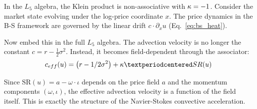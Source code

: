 In the $L_5$ algebra, the Klein product is non-associative with $\kappa = -1$. Consider the market state evolving under the log-price coordinate $x$. The price dynamics in the B-S framework are governed by the linear drift $c \cdot \partial_x u$ (Eq.~\ref{eq:bs_heat}).

Now embed this in the full $L_5$ algebra. The advection velocity is no longer the constant $c = r - \frac{1}{2}\sigma^2$. Instead, it becomes field-dependent through the associator:
\begin{equation}\label{eq:arithmetic scheme_advection}
    c_{\mathrm{eff}}(u) = \left(r - \frac{1}{2}\sigma^2\right) + \kap \cdot \mathrm{SR}(u)
\end{equation}

Since $\mathrm{SR}(u) = a - \omega\cdot\iota$ depends on the price field $a$ and the momentum components $(\omega, \iota)$, the effective advection velocity is a function of the field itself. This is exactly the structure of the Navier-Stokes convective acceleration.

